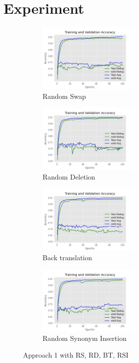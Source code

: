 \documentclass{article}
\begin{document}
\section{Experiment}
\begin{figure}
  \begin{subfigure}{6cm}
    \centering\includegraphics[width=5cm]{accuracyrandomswapA1.jpg}
    \caption{Random Swap}
  \end{subfigure}
  \begin{subfigure}{6cm}
    \centering\includegraphics[width=5cm]{accuracyrandomdeleteA1.jpg}
    \caption{Random Deletion}
  \end{subfigure}
 
  \begin{subfigure}{6cm}
    \centering\includegraphics[width=5cm]{accuracybacktranslate.jpg}
    \caption{Back translation}
  \end{subfigure}
  \begin{subfigure}{6cm}
    \centering\includegraphics[width=5cm]{accuracyrandomInsertionA1.jpg}
    \caption{Random Synonym Insertion}
  \end{subfigure}
  \caption{Approach 1 with RS, RD, BT, RSI}
  \label{fig:preaugmentA1}
\end{figure}
\end{document}
